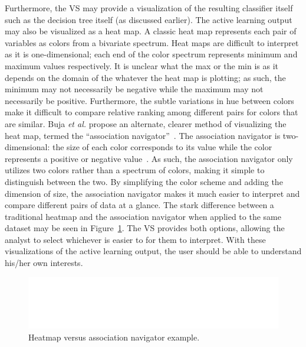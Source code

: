 Furthermore, the VS may provide a visualization of the resulting classifier 
itself such as the decision tree itself (as discussed earlier). The active 
learning output may also be visualized as a heat map. A 
classic heat map represents each pair of variables as colors from a bivariate 
spectrum. Heat maps are difficult to interpret as it is one-dimensional; each 
end of the color spectrum represents minimum and maximum values respectively. 
It is unclear what the max or the min is as it depends on the domain of the 
whatever the heat map is plotting; as such, the minimum may not necessarily be 
negative while the maximum may not necessarily be positive. Furthermore, the 
subtle variations in hue between colors make it difficult to compare relative 
ranking among different pairs for colors that are similar. Buja \textit{et al.} 
propose an alternate, clearer method of visualizing the heat map, termed the 
``association navigator''~\cite{buja2016}. The association navigator is 
two-dimensional: the size of each color corresponds to its value while the 
color 
represents a positive or negative value~\cite{buja2016}. As such, the 
association navigator only utilizes two colors rather than a spectrum of 
colors, making it simple to distinguish between the two. By simplifying the 
color scheme and adding the dimension of size, the association navigator makes 
it much easier to interpret and compare different pairs of data at a glance. 
The stark difference between a traditional heatmap and the association 
navigator when applied to the same dataset may be seen in 
Figure~\ref{fig:visualizer:heatmap}. The VS provides both options, allowing the 
analyst to select whichever is easier to for them to interpret. 
With these visualizations of the active learning output, the user should be 
able to understand his/her own interests. 

\begin{figure}[htb]
	\begin{center}
		\includegraphics[width=1\linewidth]{ch-visualizer/figures/heatmap}
		\caption[Heatmap versus association navigator]{Heatmap versus 
		association navigator example.}
		\label{fig:visualizer:heatmap}
	\end{center}
\end{figure}

